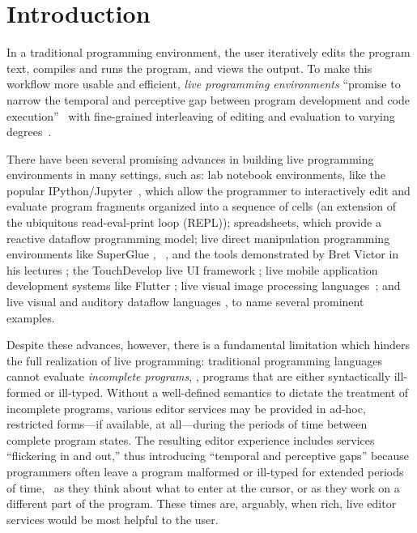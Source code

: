 \newcommand{\introSec}{Introduction}
\section{\protect\introSec} %
\label{sec:intro}

In a traditional programming environment, the user iteratively edits the program
text, compiles and runs the program, and views the output.
%
To make this workflow more usable and efficient, \emph{live programming
environments} ``promise to narrow the temporal and perceptive gap between
program development and code execution''~\cite{burckhardt2013s} with
fine-grained interleaving of editing and evaluation to varying
degrees~\cite{DBLP:journals/vlc/Tanimoto90,DBLP:conf/icse/Tanimoto13}.

There have been several promising advances in building live programming
environments in many settings, such as:
%
{lab notebook environments}, like the popular
IPython/Jupyter~\cite{PER-GRA:2007}, which allow the programmer to interactively
edit and evaluate program fragments organized into a sequence of cells (an
extension of the ubiquitous read-eval-print loop (REPL));
%
spreadsheets, which provide a reactive dataflow programming model;
%
live direct manipulation programming environments like SuperGlue
\cite{McDirmid:2007}, \sns{}~\cite{sns-pldi,sns-uist}, and the tools
demonstrated by Bret Victor in his lectures \cite{victor2012inventing};
%
the TouchDevelop live UI framework \cite{burckhardt2013s};
%
live mobile application development systems like Flutter \cite{flutter};
%
live visual image processing languages~\cite{DBLP:journals/vlc/Tanimoto90};
%
and live visual and auditory dataflow languages \cite{DBLP:conf/vl/BurnettAW98},
to name several prominent examples.

Despite these advances, however, there is a fundamental limitation which hinders
the full realization of live programming: traditional programming languages
cannot evaluate \emph{incomplete programs}, \ie{}, programs that are either
syntactically ill-formed or ill-typed.
%
Without a well-defined semantics to dictate the treatment of incomplete
programs, various editor services may be provided in ad-hoc, restricted
forms---if available, at all---during the periods of time between complete
program states.
%
%
%
The resulting editor experience includes services ``flickering in and out,''
thus introducing ``temporal and perceptive gaps'' because programmers often
leave a program malformed or ill-typed for extended periods of time, \eg{}~as
they think about what to enter at the cursor, or as they work on a different
part of the program.
%
These times are, arguably, when rich, live editor services would be most helpful
to the user.

